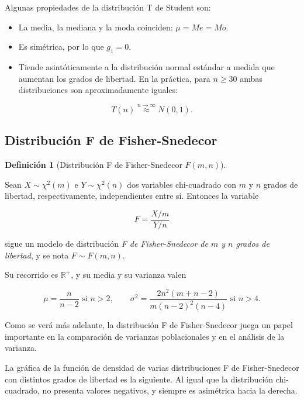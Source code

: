 \documentclass[
  spanish,
  a4paper,
]{scrreport}
\providecommand{\tightlist}{%
  \setlength{\itemsep}{0pt}\setlength{\parskip}{0pt}}
\theoremstyle{plain}
\theoremstyle{definition}
\theoremstyle{definition}
\newtheorem{definition}{Definición}[chapter]
\theoremstyle{remark}
\begin{document}
Algunas propiedades de la distribución T de Student son:

\begin{itemize}
\tightlist
\item
  La media, la mediana y la moda coinciden: \(\mu=Me=Mo\).
\item
  Es simétrica, por lo que \(g_1=0\).
\item
  Tiende asintóticamente a la distribución normal estándar a medida que
  aumentan los grados de libertad. En la práctica, para \(n\geq 30\)
  ambas distribuciones son aproximadamente iguales:
\end{itemize}

\[
T(n)\stackrel{n\rightarrow \infty}{\approx}N(0,1).
\]

\subsection{Distribución F de
Fisher-Snedecor}\label{distribuciuxf3n-f-de-fisher-snedecor}

\begin{definition}[Distribución F de Fisher-Snedecor
\(F(m,n)\)]\protect\hypertarget{def-distribucion-f-fisher}{}\label{def-distribucion-f-fisher}

Sean \(X\sim \chi^2(m)\) e \(Y\sim \chi^2(n)\) dos variables
chi-cuadrado con \(m\) y \(n\) grados de libertad, respectivamente,
independientes entre sí. Entonces la variable

\[
F = \frac{X/m}{Y/n}
\]

sigue un modelo de distribución \emph{F de Fisher-Snedecor de \(m\) y
\(n\) grados de libertad}, y se nota \(F\sim F(m,n)\).

\end{definition}

Su recorrido es \(\mathbb{R}^+\), y su media y su varianza valen

\[
\mu = \frac{n}{n-2} \mbox{ si } n>2, \qquad \sigma^2 =\frac{2n^2(m+n-2)}{m(n-2)^2(n-4)}\mbox{ si } n>4.
\]

Como se verá más adelante, la distribución F de Fisher-Snedecor juega un
papel importante en la comparación de varianzas poblacionales y en el
análisis de la varianza.

La gráfica de la función de densidad de varias distribuciones F de
Fisher-Snedecor con distintos grados de libertad es la siguiente. Al
igual que la distribución chi-cuadrado, no presenta valores negativos, y
siempre es asimétrica hacia la derecha.
\end{document}
